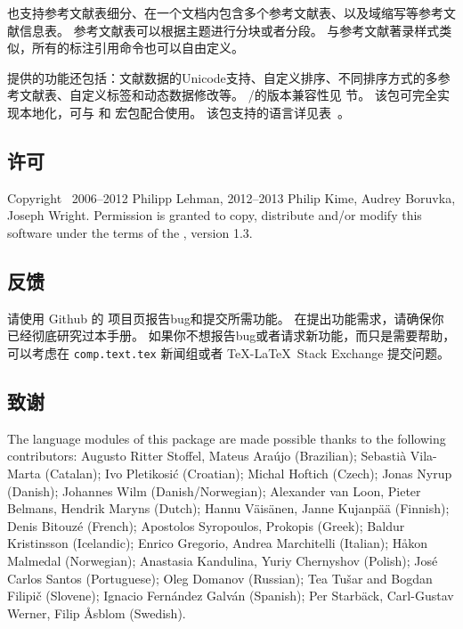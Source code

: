 \biblatex 也支持参考文献表细分、在一个文档内包含多个参考文献表、以及域缩写等参考文献信息表。
参考文献表可以根据主题进行分块或者分段。
与参考文献著录样式类似，所有的标注引用命令也可以自由定义。

提供的功能还包括：文献数据的Unicode支持、自定义排序、不同排序方式的多参考文献表、自定义标签和动态数据修改等。
\biber/\biblatex 的版本兼容性见  节。
该包可完全实现本地化，可与  和  宏包配合使用。
该包支持的语言详见表~。


\subsection{许可}

Copyright \textcopyright\ 2006--2012 Philipp Lehman, 2012--2013 Philip Kime, Audrey Boruvka, Joseph Wright. Permission is granted to copy, distribute and\slash or modify this software under  the terms of the \lppl, version 1.3.

\subsection{反馈}
\label{int:feb}


请使用 Github 的 \biblatex 项目页报告bug和提交所需功能。
在提出功能需求，请确保你已经彻底研究过本手册。
如果你不想报告bug或者请求新功能，而只是需要帮助，
可以考虑在 \texttt{comp.text.tex} 新闻组或者 \TeX-\LaTeX\ Stack Exchange 提交问题。

\subsection{致谢}

The language modules of this package are made possible thanks to the following contributors:
Augusto Ritter Stoffel, Mateus Araújo (Brazilian);
Sebastià Vila-Marta (Catalan);
Ivo Pletikosić (Croatian);
Michal Hoftich (Czech);
Jonas Nyrup (Danish);
Johannes Wilm (Danish\slash Norwegian);
Alexander van Loon, Pieter Belmans, Hendrik Maryns (Dutch);
Hannu Väisänen, Janne Kujanpää (Finnish);
Denis Bitouzé (French);
Apostolos Syropoulos, Prokopis (Greek);
Baldur Kristinsson (Icelandic);
Enrico Gregorio, Andrea Marchitelli (Italian);
Håkon Malmedal (Norwegian);
Anastasia Kandulina, Yuriy Chernyshov (Polish);
José Carlos Santos (Portuguese);
Oleg Domanov (Russian);
Tea Tušar and Bogdan Filipič (Slovene);
Ignacio Fernández Galván (Spanish);
Per Starbäck, Carl-Gustav Werner, Filip Åsblom (Swedish).

